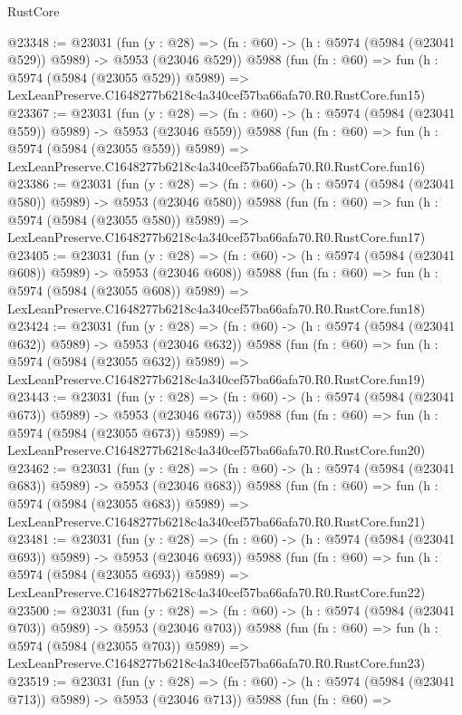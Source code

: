 \begin{lexlean}{RustCore}
\begin{coremodule}
@23348 := @23031
    (fun (y : @28) => (fn : @60) -> (h : @5974 (@5984 (@23041 @529)) @5989) -> @5953 (@23046 @529))
    @5988
    (fun (fn : @60) =>
    fun (h : @5974 (@5984 (@23055 @529)) @5989) =>
    LexLeanPreserve.C1648277b6218c4a340cef57ba66afa70.R0.RustCore.fun15)
@23367 := @23031
    (fun (y : @28) => (fn : @60) -> (h : @5974 (@5984 (@23041 @559)) @5989) -> @5953 (@23046 @559))
    @5988
    (fun (fn : @60) =>
    fun (h : @5974 (@5984 (@23055 @559)) @5989) =>
    LexLeanPreserve.C1648277b6218c4a340cef57ba66afa70.R0.RustCore.fun16)
@23386 := @23031
    (fun (y : @28) => (fn : @60) -> (h : @5974 (@5984 (@23041 @580)) @5989) -> @5953 (@23046 @580))
    @5988
    (fun (fn : @60) =>
    fun (h : @5974 (@5984 (@23055 @580)) @5989) =>
    LexLeanPreserve.C1648277b6218c4a340cef57ba66afa70.R0.RustCore.fun17)
@23405 := @23031
    (fun (y : @28) => (fn : @60) -> (h : @5974 (@5984 (@23041 @608)) @5989) -> @5953 (@23046 @608))
    @5988
    (fun (fn : @60) =>
    fun (h : @5974 (@5984 (@23055 @608)) @5989) =>
    LexLeanPreserve.C1648277b6218c4a340cef57ba66afa70.R0.RustCore.fun18)
@23424 := @23031
    (fun (y : @28) => (fn : @60) -> (h : @5974 (@5984 (@23041 @632)) @5989) -> @5953 (@23046 @632))
    @5988
    (fun (fn : @60) =>
    fun (h : @5974 (@5984 (@23055 @632)) @5989) =>
    LexLeanPreserve.C1648277b6218c4a340cef57ba66afa70.R0.RustCore.fun19)
@23443 := @23031
    (fun (y : @28) => (fn : @60) -> (h : @5974 (@5984 (@23041 @673)) @5989) -> @5953 (@23046 @673))
    @5988
    (fun (fn : @60) =>
    fun (h : @5974 (@5984 (@23055 @673)) @5989) =>
    LexLeanPreserve.C1648277b6218c4a340cef57ba66afa70.R0.RustCore.fun20)
@23462 := @23031
    (fun (y : @28) => (fn : @60) -> (h : @5974 (@5984 (@23041 @683)) @5989) -> @5953 (@23046 @683))
    @5988
    (fun (fn : @60) =>
    fun (h : @5974 (@5984 (@23055 @683)) @5989) =>
    LexLeanPreserve.C1648277b6218c4a340cef57ba66afa70.R0.RustCore.fun21)
@23481 := @23031
    (fun (y : @28) => (fn : @60) -> (h : @5974 (@5984 (@23041 @693)) @5989) -> @5953 (@23046 @693))
    @5988
    (fun (fn : @60) =>
    fun (h : @5974 (@5984 (@23055 @693)) @5989) =>
    LexLeanPreserve.C1648277b6218c4a340cef57ba66afa70.R0.RustCore.fun22)
@23500 := @23031
    (fun (y : @28) => (fn : @60) -> (h : @5974 (@5984 (@23041 @703)) @5989) -> @5953 (@23046 @703))
    @5988
    (fun (fn : @60) =>
    fun (h : @5974 (@5984 (@23055 @703)) @5989) =>
    LexLeanPreserve.C1648277b6218c4a340cef57ba66afa70.R0.RustCore.fun23)
@23519 := @23031
    (fun (y : @28) => (fn : @60) -> (h : @5974 (@5984 (@23041 @713)) @5989) -> @5953 (@23046 @713))
    @5988
    (fun (fn : @60) =>

\end{coremodule}
\end{lexlean}
